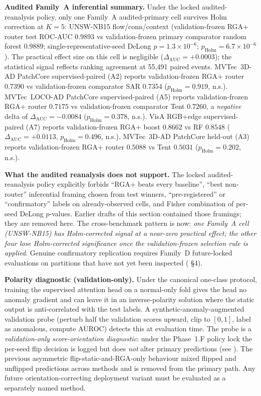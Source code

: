 \documentclass[10pt,conference]{IEEEtran}
\newcommand{\methodplus}{RGA+}
\begin{document}
\noindent\textbf{Audited Family~A inferential summary.}
Under the locked audited-reanalysis policy, only one Family~A
audited-primary cell survives Holm correction at $K{=}5$:
UNSW-NB15 flow/conn/context (validation-frozen RGA+ router test
ROC-AUC $0.9893$ vs validation-frozen primary comparator random
forest $0.9889$; single-representative-seed DeLong
$p=1.3\!\times\!10^{-6}$; $p_{\mathrm{Holm}}=6.7\!\times\!10^{-6}$).
The practical effect size on this cell is negligible
($\Delta_{\mathrm{AUC}}=+0.0003$); the statistical signal reflects
ranking agreement at 55{,}491 paired events.
MVTec~3D-AD PatchCore supervised-paired (A2) reports
validation-frozen RGA+ router $0.7390$ vs validation-frozen
comparator SAR $0.7354$
($p_{\mathrm{Holm}}=0.919$, n.s.).
MVTec~LOCO-AD PatchCore supervised-paired (A5) reports
validation-frozen RGA+ router $0.7175$ vs validation-frozen
comparator Tent $0.7260$, a \emph{negative} delta of
$\Delta_{\mathrm{AUC}}=-0.0084$
($p_{\mathrm{Holm}}=0.378$, n.s.). VisA RGB+edge supervised-paired
(A7) reports validation-frozen RGA+ boost $0.8662$ vs RF $0.8548$
($\Delta_{\mathrm{AUC}}=+0.0113$,
$p_{\mathrm{Holm}}=0.496$, n.s.). MVTec~3D-AD PatchCore held-out
(A3) reports validation-frozen RGA+ router $0.5088$ vs Tent
$0.5031$ ($p_{\mathrm{Holm}}=0.202$, n.s.).

\noindent\textbf{What the audited reanalysis does not support.}
The locked audited-reanalysis policy explicitly forbids
``\methodplus{} beats every baseline'', ``best non-router'' inferential
framing chosen from test winners, ``pre-registered'' or
``confirmatory'' labels on already-observed cells, and Fisher
combination of per-seed DeLong $p$-values. Earlier drafts of this
section contained those framings; they are removed here. The
cross-benchmark pattern is now: \emph{one Family~A cell (UNSW-NB15)
has Holm-corrected signal at a near-zero practical effect; the
other four lose Holm-corrected significance once the validation-frozen
selection rule is applied}. Genuine confirmatory replication
requires Family~D future-locked evaluations on partitions that have
not yet been inspected
( §4).

\noindent\textbf{Polarity diagnostic (validation-only).} Under the
canonical one-class protocol, training the supervised attention head
on a normal-only fold gives the head no anomaly gradient and can
leave it in an inverse-polarity solution where the static output is
anti-correlated with the test labels. A synthetic-anomaly-augmented
validation probe (perturb half the validation scores upward, clip to
$[0,1]$, label as anomalous, compute AUROC) detects this at
evaluation time. The probe is a \emph{validation-only score-orientation
diagnostic}: under the Phase~1.F policy lock the per-seed flip
decision is logged but does \emph{not} alter primary predictions
(see ). The
previous asymmetric flip-static-and-RGA-only behaviour mixed
flipped and unflipped predictions across methods and is removed
from the primary path. Any future orientation-correcting deployment
variant must be evaluated as a separately named method.
\end{document}
